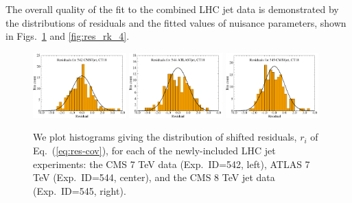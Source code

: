%
The overall quality of the fit to the combined LHC jet data is 
demonstrated by the distributions of residuals and the fitted 
values of nuisance parameters, shown in
Figs.~\ref{fig:res_rk_2} and \ref{fig:res_rk_4}.
%
\begin{figure}[htbp]
	\includegraphics[width=0.32\textwidth]{./fig/SuppMat/res_his_CT18-542_4_ect.pdf}
	\includegraphics[width=0.32\textwidth]{./fig/SuppMat/res_his_CT18-544_4_ect.pdf}
	\includegraphics[width=0.32\textwidth]{./fig/SuppMat/res_his_CT18-545_4_ect.pdf}
	\caption{We plot histograms giving the distribution of shifted residuals, $r_i$ of Eq.~(\ref{eq:res-cov}), for each of the newly-included
	LHC jet experiments: the CMS 7 TeV data (Exp.~ID=542, left), ATLAS 7 TeV (Exp.~ID=544, center), and the CMS 8 TeV jet data (Exp.~ID=545, right).
		\label{fig:res_rk_2}}
\end{figure}

